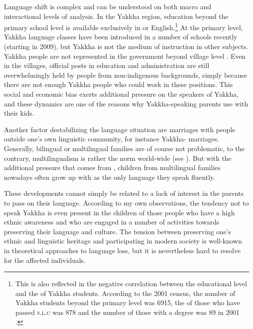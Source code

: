 \largerpage[-1] 
Language shift is complex and can be understood on both macro and interactional levels of analysis. In the Yakkha region, education beyond the primary school level is available exclusively in  or English.\footnote{This is also reflected in the negative correlation between the educational level and the  of Yakkha students. According to the 2001 census, the number of Yakkha students beyond the primary level was 6915, the  of those who have passed \textsc{s.l.c} was 878 and the number of those with a degree was 89 in 2001 \citep{CBS2001Report}.} At the primary level, Yakkha language classes have been introduced in a number of schools recently (starting in 2009), but Yakkha is not the medium of instruction in other subjects. Yakkha people are not represented in the government beyond village level \citep{CBS2001Report}. Even in the villages, official posts in education and administration are still overwhelmingly held by people from  non-indigenous backgrounds, simply because there are not enough Yakkha people who could work in these positions. This social and economic bias exerts additional pressure on the speakers of Yakkha, and these dynamics are one of the reasons why Yakkha-speaking parents use  with their kids. 


Another factor destabilizing the language situation are marriages with people outside one's  own linguistic community, for instance Yakkha- marriages. Generally, bilingual or multilingual families are of course not problematic, to the contrary, multilingualism is rather the norm world-wide (see \citealt{Turin2007_Diversity}). But with the additional pressure that comes from , children from multilingual families nowadays often grow up with  as the only language they speak fluently. 

These developments cannot simply be related to a lack of interest in the parents to pass on their language. According to my own observations, the tendency not to speak Yakkha is even present in the children of those people who have a high ethnic awareness and who are engaged in a number of activities towards preserving their language and culture. The tension between preserving one's  ethnic and linguistic heritage and participating in modern society is well-known in theoretical approaches to language loss, but it is nevertheless hard to resolve for the affected individuals.

